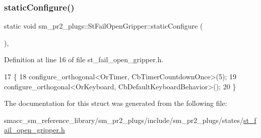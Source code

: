 \subsubsection{\texorpdfstring{static\+Configure()}{staticConfigure()}}
{\footnotesize\ttfamily static void sm\+\_\+pr2\+\_\+plugs\+::\+St\+Fail\+Open\+Gripper\+::static\+Configure (\begin{DoxyParamCaption}{ }\end{DoxyParamCaption})\hspace{0.3cm}{\ttfamily [inline]}, {\ttfamily [static]}}



Definition at line 16 of file st\+\_\+fail\+\_\+open\+\_\+gripper.\+h.


\begin{DoxyCode}
17     \{
18         configure\_orthogonal<OrTimer,  CbTimerCountdownOnce>(5);    
19         configure\_orthogonal<OrKeyboard, CbDefaultKeyboardBehavior>();
20     \}
\end{DoxyCode}


The documentation for this struct was generated from the following file\+:\begin{DoxyCompactItemize}
\item 
smacc\+\_\+sm\+\_\+reference\+\_\+library/sm\+\_\+pr2\+\_\+plugs/include/sm\+\_\+pr2\+\_\+plugs/states/\hyperlink{st__fail__open__gripper_8h}{st\+\_\+fail\+\_\+open\+\_\+gripper.\+h}\end{DoxyCompactItemize}
